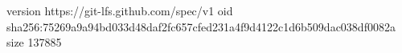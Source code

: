 version https://git-lfs.github.com/spec/v1
oid sha256:75269a9a94bd033d48daf2fc657cfed231a4f9d4122c1d6b509dac038df0082a
size 137885
